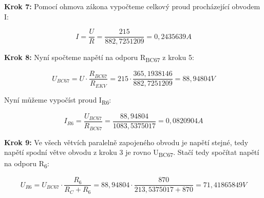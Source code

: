 \textbf{Krok 7:} Pomocí ohmova zákona vypočteme celkový proud procházející obvodem I:

\[ I = \frac{U}{R} = \frac{215}{882,7251209} = 0,2435639A \]

\textbf{Krok 8:} Nyní spočteme napětí na odporu R\textsubscript{BC67} z kroku 5:

\[ U_{BC67} = U \cdot \frac{R_{BC67}}{R_{EKV}} = 215 \cdot \frac{365,1938146}{882,7251209} = 88,94804V \]

Nyní můžeme vypočíst proud I\textsubscript{R6}:

\[ I_{R6} = \frac{U_{BC67}}{R_{BC67}} = \frac{88,94804}{1083,5375017} = 0,0820904A \]

\textbf{Krok 9:} Ve všech větvích paralelně zapojeného obvodu je napětí stejné, tedy napětí spodní větve obvodu z kroku 3 je rovno U\textsubscript{BC67}. Stačí tedy spočítat napětí na odporu R\textsubscript{6}:

\[ U_{R6} = U_{BC67} \cdot \frac{R_{6}}{R_{C} + R_{6}} = 88,94804 \cdot \frac{870}{213,5375017 + 870} = 71,41865849V \]